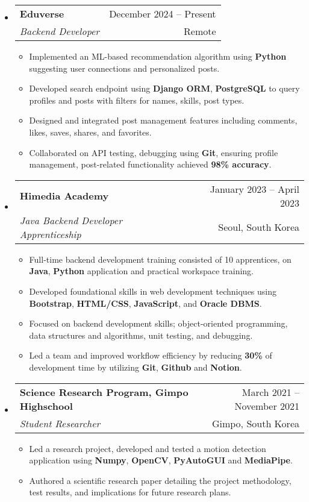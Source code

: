 \documentclass[letterpaper,11pt]{article}
\makeatletter
\newcommand{\resumeItem}[1]{
  \item\small{
    {#1 \vspace{-3pt}}
  }
}
\newcommand{\resumeSubheading}[4]{
    \item
    \begin{tabular*}{0.97\textwidth}[t]{l@{\extracolsep{\fill}}r@{\hspace{-0.2in}}}
        \small{\textbf{#1}} & \small{#2} \\
        \textit{\small#3} & \small #4 \\
    \end{tabular*}\vspace{-5pt}
}
\newcommand{\resumeSubHeadingListStart}{\begin{itemize}[leftmargin=0.00in, rightmargin=-0.2in, label={}]}
\newcommand{\resumeSubHeadingListEnd}{\end{itemize}\vspace{-7pt}}
\newcommand{\resumeItemListStart}{\begin{itemize}[leftmargin=0.15in, rightmargin=0.15in]}
\newcommand{\resumeItemListEnd}{\end{itemize}\vspace{-7pt}}
\makeatother
\begin{document}
\resumeSubHeadingListStart
\resumeSubheading
{Eduverse}{December 2024 -- Present}
{Backend Developer}{Remote}
\resumeItemListStart
\resumeItem{Implemented an ML-based recommendation algorithm using \textbf{Python} suggesting user connections and personalized posts.}
\resumeItem{Developed search endpoint using \textbf{Django ORM}, \textbf{PostgreSQL} to query profiles and posts with filters for names, skills, post types.}
\resumeItem{Designed and integrated post management features including comments, likes, saves, shares, and favorites.}
\resumeItem{Collaborated on API testing, debugging using \textbf{Git}, ensuring profile management, post-related functionality achieved \textbf{98\% accuracy}.}
\resumeItemListEnd
\resumeSubHeadingListEnd


\resumeSubHeadingListStart
\resumeSubheading
{Himedia Academy}{January 2023 -- April 2023}
{Java Backend Developer Apprenticeship}{Seoul, South Korea}
\resumeItemListStart
\resumeItem{Full-time backend development training consisted of 10 apprentices, on \textbf{Java}, \textbf{Python} application and practical workspace training.}
\resumeItem{Developed foundational skills in web development techniques using \textbf{Bootstrap}, \textbf{HTML/CSS}, \textbf{JavaScript}, and \textbf{Oracle DBMS}.}
\resumeItem{Focused on backend development skills; object-oriented programming, data structures and algorithms, unit testing, and debugging.}
\resumeItem{Led a team and improved workflow efficiency by reducing \textbf{30\%} of development time by utilizing \textbf{Git}, \textbf{Github} and \textbf{Notion}.}
\resumeItemListEnd
\resumeSubHeadingListEnd

\resumeSubHeadingListStart
\resumeSubheading
{Science Research Program, Gimpo Highschool}{March 2021 -- November 2021}
{Student Researcher}{Gimpo, South Korea}
\resumeItemListStart
\resumeItem{Led a research project, developed and tested a motion detection application using \textbf{Numpy}, \textbf{OpenCV}, \textbf{PyAutoGUI} and \textbf{MediaPipe}.}
\resumeItem{Authored a scientific research paper detailing the project methodology, test results, and implications for future research plans.}
\resumeItemListEnd
\resumeSubHeadingListEnd
\end{document}
